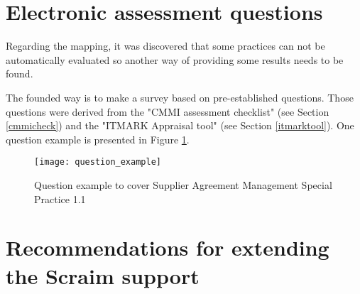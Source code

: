







\section{Electronic assessment questions} \label{sec:question}

Regarding the mapping, it was discovered  that some practices can not be automatically evaluated so another way of providing some results needs to be found.

The founded way is to make a survey based on pre-established questions. Those questions were derived from the "CMMI assessment checklist" (see Section \ref{cmmicheck}) and  the "ITMARK Appraisal tool" (see Section \ref{itmarktool}). One question example is presented in Figure \ref{fig:question_example}.

\begin{figure}[!htb]
	\begin{center}
		\leavevmode
		\texttt{[image: question\_example]}
		\caption{Question example to cover Supplier Agreement Management Special Practice 1.1}
		\label{fig:question_example}
	\end{center}
\end{figure}

\section{Recommendations for extending the Scraim support}

